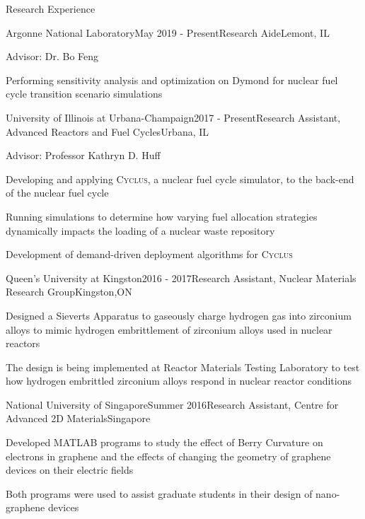 \documentclass{resume2} %
\begin{document}
\begin{rSection}{Research Experience}

\begin{rSubsection}{Argonne National Laboratory}{May 2019 - Present}{Research Aide}{Lemont, IL}
	\item Advisor: Dr. Bo Feng 
	\item Performing sensitivity analysis and optimization on Dymond for nuclear fuel cycle transition scenario simulations 
\end{rSubsection}

\begin{rSubsection}{University of Illinois at Urbana-Champaign}{2017 - Present}{Research Assistant, Advanced Reactors and Fuel Cycles}{Urbana, IL}
\item Advisor: Professor Kathryn D. Huff
\item Developing and applying \textsc{Cyclus}, a nuclear fuel cycle simulator, to the back-end of the nuclear fuel cycle
\item Running simulations to determine how varying fuel allocation strategies dynamically impacts the loading of a nuclear waste repository
\item Development of demand-driven deployment algorithms for \textsc{Cyclus} 
\end{rSubsection}

\begin{rSubsection}{Queen's University at Kingston}{2016 - 2017}{Research Assistant, Nuclear Materials Research Group}{Kingston,ON}
\item Designed a Sieverts Apparatus to gaseously charge hydrogen gas into zirconium alloys to mimic hydrogen embrittlement of zirconium alloys used in nuclear reactors
\item The design is being implemented at Reactor Materials Testing Laboratory to test how hydrogen embrittled zirconium alloys respond in nuclear reactor conditions
\iffalse
\item Application to nuclear industry: zirconium alloys used in nuclear reactors succumb to hydrogen embrittlement during its lifetime, therefore, it is important to be able to replicate the conditions in nuclear reactors, so as to study its end-of-life conditions
\fi
\end{rSubsection}

\begin{rSubsection}{National University of Singapore}{Summer 2016}{Research Assistant, Centre for Advanced 2D Materials}{Singapore}
	\item Developed MATLAB programs to study the effect of Berry Curvature on electrons in graphene and the effects of changing the geometry of graphene devices on their electric fields 
	\item Both programs were used to assist graduate students in their design of nano-graphene devices
\end{rSubsection}


\end{rSection}
\end{document}
